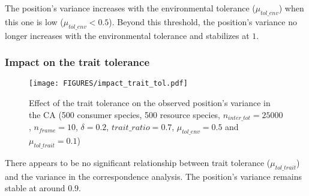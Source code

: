 The position's variance increases with the environmental tolerance ($\mu_{tol\_env}$) when this one is low ($\mu_{tol\_env} < 0.5$). Beyond this threshold, the position's variance no longer increases with the environmental tolerance and stabilizes at $1$. 

\subsubsection{Impact on the trait tolerance}

\begin{figure}[H]
    \centering
    \texttt{[image: FIGURES/impact\_trait\_tol.pdf]}
    \caption{Effect of the trait tolerance on the observed position's variance in the CA (500 consumer species, 500 resource species, $n_{inter\_tot} = 25000$, $n_{frame} = 10$, $\delta =  0.2$, $trait\_ratio = 0.7$, $\mu_{tol\_env} = 0.5$ and $\mu_{tol\_trait} = 0.1$)}
    \label{fig:effect_trait}
\end{figure}

There appears to be no significant relationship between trait tolerance ($\mu_{tol\_trait}$) and the variance in the correspondence analysis. The position's variance remains stable at around $0.9$.